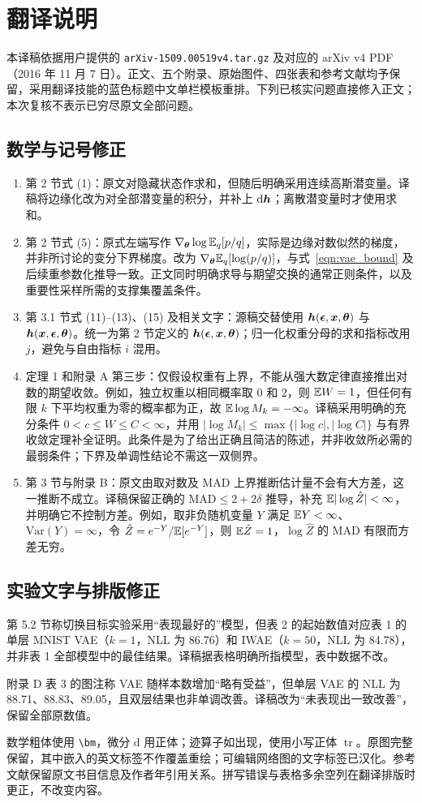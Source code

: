 \clearpage
\section*{翻译说明}
本译稿依据用户提供的 \texttt{arXiv-1509.00519v4.tar.gz} 及对应的 arXiv v4 PDF（2016 年 11 月 7 日）。正文、五个附录、原始图件、四张表和参考文献均予保留，采用翻译技能的蓝色标题中文单栏模板重排。下列已核实问题直接修入正文；本次复核不表示已穷尽原文全部问题。

\subsection*{数学与记号修正}
\begin{enumerate}
\item 第 2 节式 (1)：原文对隐藏状态作求和，但随后明确采用连续高斯潜变量。译稿将边缘化改为对全部潜变量的积分，并补上 $\mathrm{d}\bm{h}$；离散潜变量时才使用求和。
\item 第 2 节式 (5)：原式左端写作 $\nabla_{\bm{\theta}}\log\mathbb{E}_q[p/q]$，实际是边缘对数似然的梯度，并非所讨论的变分下界梯度。改为 $\nabla_{\bm{\theta}}\mathbb{E}_q[\log(p/q)]$，与式~\eqref{eqn:vae_bound} 及后续重参数化推导一致。正文同时明确求导与期望交换的通常正则条件，以及重要性采样所需的支撑集覆盖条件。
\item 第 3.1 节式 (11)--(13)、(15) 及相关文字：源稿交替使用 $\bm{h}(\bm{\epsilon},\bm{x},{\bm{\theta}})$ 与 $\bm{h}(\bm{x},\bm{\epsilon},{\bm{\theta}})$。统一为第 2 节定义的 $\bm{h}(\bm{\epsilon},\bm{x},{\bm{\theta}})$；归一化权重分母的求和指标改用 $j$，避免与自由指标 $i$ 混用。
\item 定理 1 和附录 A 第三步：仅假设权重有上界，不能从强大数定律直接推出对数的期望收敛。例如，独立权重以相同概率取 $0$ 和 $2$，则 $\mathbb{E} W=1$，但任何有限 $k$ 下平均权重为零的概率都为正，故 $\mathbb{E}\log M_k=-\infty$。译稿采用明确的充分条件 $0<c\leq W\leq C<\infty$，并用 $|\log M_k|\leq\max\{|\log c|,|\log C|\}$ 与有界收敛定理补全证明。此条件是为了给出正确且简洁的陈述，并非收敛所必需的最弱条件；下界及单调性结论不需这一双侧界。
\item 第 3 节与附录 B：原文由取对数及 MAD 上界推断估计量不会有大方差，这一推断不成立。译稿保留正确的 $\mathrm{MAD}\leq2+2\delta$ 推导，补充 $\mathbb{E}|\log\hat Z|<\infty$，并明确它不控制方差。例如，取非负随机变量 $Y$ 满足 $\mathbb{E} Y<\infty$、$\mathrm{Var}(Y)=\infty$，令 $\hat Z=e^{-Y}/\mathbb{E}[e^{-Y}]$，则 $\mathbb{E}\hat Z=1$，$\log\hat Z$ 的 MAD 有限而方差无穷。
\end{enumerate}

\subsection*{实验文字与排版修正}
第 5.2 节称切换目标实验采用“表现最好的”模型，但表 2 的起始数值对应表 1 的单层 MNIST VAE（$k=1$，NLL 为 86.76）和 IWAE（$k=50$，NLL 为 84.78），并非表 1 全部模型中的最佳结果。译稿据表格明确所指模型，表中数据不改。

附录 D 表 3 的图注称 VAE 随样本数增加“略有受益”，但单层 VAE 的 NLL 为 88.71、88.83、89.05，且双层结果也非单调改善。译稿改为“未表现出一致改善”，保留全部原数值。

数学粗体使用 \verb|\bm|，微分 $\mathrm{d}$ 用正体；迹算子如出现，使用小写正体 $\operatorname{tr}$。原图完整保留，其中嵌入的英文标签不作覆盖重绘；可编辑网络图的文字标签已汉化。参考文献保留原文书目信息及作者年引用关系。拼写错误与表格多余空列在翻译排版时更正，不改变内容。
